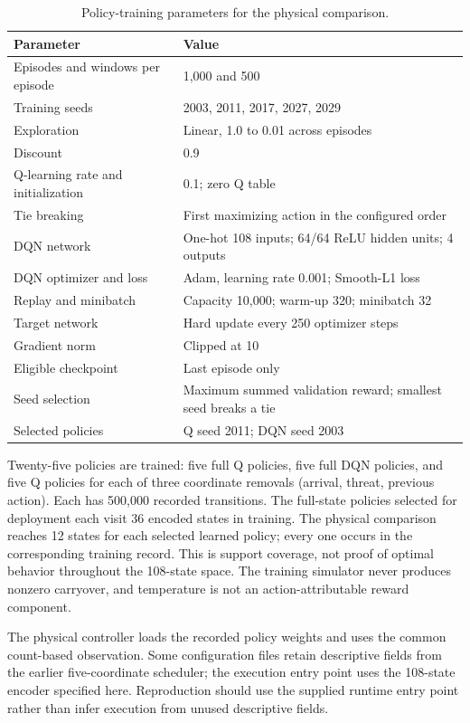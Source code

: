 \documentclass[10pt,a4paper]{article}
\begin{document}
\begin{table}[h!]\centering\small
\caption{Policy-training parameters for the physical comparison.}
\begin{tabular}{p{.39\linewidth}p{.52\linewidth}}\toprule
Parameter & Value\\\midrule
Episodes and windows per episode & 1,000 and 500\\
Training seeds & 2003, 2011, 2017, 2027, 2029\\
Exploration & Linear, 1.0 to 0.01 across episodes\\
Discount & 0.9\\
Q-learning rate and initialization & 0.1; zero Q table\\
Tie breaking & First maximizing action in the configured order\\
DQN network & One-hot 108 inputs; 64/64 ReLU hidden units; 4 outputs\\
DQN optimizer and loss & Adam, learning rate 0.001; Smooth-L1 loss\\
Replay and minibatch & Capacity 10,000; warm-up 320; minibatch 32\\
Target network & Hard update every 250 optimizer steps\\
Gradient norm & Clipped at 10\\
Eligible checkpoint & Last episode only\\
Seed selection & Maximum summed validation reward; smallest seed breaks a tie\\
Selected policies & Q seed 2011; DQN seed 2003\\\bottomrule
\end{tabular}\end{table}

Twenty-five policies are trained: five full Q policies, five full DQN policies, and five Q policies for each of three coordinate removals (arrival, threat, previous action). Each has 500,000 recorded transitions. The full-state policies selected for deployment each visit 36 encoded states in training. The physical comparison reaches 12 states for each selected learned policy; every one occurs in the corresponding training record. This is support coverage, not proof of optimal behavior throughout the 108-state space. The training simulator never produces nonzero carryover, and temperature is not an action-attributable reward component.

The physical controller loads the recorded policy weights and uses the common count-based observation. Some configuration files retain descriptive fields from the earlier five-coordinate scheduler; the execution entry point uses the 108-state encoder specified here. Reproduction should use the supplied runtime entry point rather than infer execution from unused descriptive fields.
\end{document}
